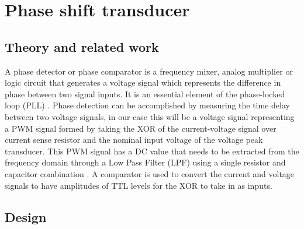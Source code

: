 \chapter{Phase shift transducer}
\section{Theory and related work} \label{sec:literature_phase}

A phase detector or phase comparator is a frequency mixer, analog multiplier or logic circuit that generates a voltage signal which represents the difference in phase between two signal inputs. It is an essential element of the phase-locked loop (PLL) \cite{phase_wiki}.
Phase detection can be accomplished by measuring the time delay between two voltage signals, in our case this will be a voltage signal representing a PWM signal formed by taking the XOR of the current-voltage signal over current sense resistor and the nominal input voltage of the voltage peak transducer. This PWM signal has a DC value that needs to be extracted from the frequency domain through a Low Pass Filter (LPF) using a single resistor and capacitor combination \cite{DC_Analogue}.
A comparator is used to convert the current and voltage signals to have amplitudes of TTL levels \cite{Comparator} for the XOR to take in as inputs.

\section{Design} \label{sec:design_phase}

